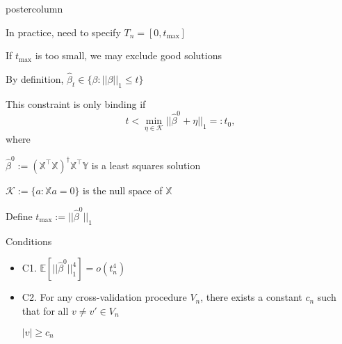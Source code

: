 \documentclass[final]{beamer}
\newcommand{\alb}[1]{\textcolor{bluemain}{#1}}
\newcommand{\tmax}{t_{\max}}
\newcommand{\ols}{\hat\beta^0}
\renewcommand{\hat}{\widehat}
\newcommand{\vsp}{\vspace{.2in}}
\newcommand{\bluebox}{\hspace{1em}\alb{\raisebox{.25ex}{\rule{1ex}{1ex}}}\hspace{1ex}}
\begin{document}
\begin{frame}
\begin{columns}
\begin{column}{.49\textwidth}
\begin{beamercolorbox}[center,wd=\textwidth]{postercolumn}
\begin{minipage}[T]{.96\textwidth}
{            
              In practice, need to specify $T_n = [0, \tmax]$
              
              \vsp
              If $\tmax$ is too small, we may exclude good solutions
              \vsp
              
              By definition, $\hat\beta_t  \in \{ \beta : ||\beta||_1 \leq t\}$
              
              \vsp
              This constraint is only binding if
              \[
              t < \min_{\eta \in \mathcal{K}} || \ols +
              \eta||_1 =: t_0,
              \]
              where 
              \vsp

              $\ols := (\mathbb{X}^{\top}\mathbb{X})^\dagger\mathbb{X}^{\top} \mathbb{Y}$ is a least
              squares solution
              
              \vsp
              $\mathcal{K} := \{a : \mathbb{X}a = 0\}$ is the null space of $\mathbb{X}$
              \vsp
              
              Define $\tmax := ||\ols||_1$

            \vfill
            \begin{block}{Conditions}		
              \begin{itemize}
              \item[]\alb{C1.}  $
                \mathbb{E}\left[||\ols||_1^{4}\right] = o(t_n^4)$
                \vsp
              \item[]\alb{C2.}  For any cross-validation procedure $V_n$,  
                there exists a constant $c_n$
                such that for all $v\neq v' \in V_n$
                \vsp
                
                \bluebox $|v| \geq c_n$


\end{itemize}
\end{block}}
\end{minipage}
\end{beamercolorbox}
\end{column}
\end{columns}
\end{frame}
\end{document}
